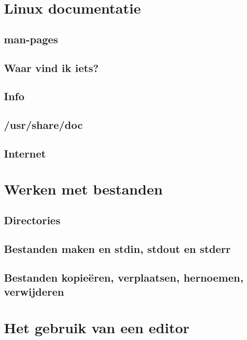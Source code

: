 \documentclass[a4paper,12pt,twoside,openright,titlepage]{book}
\begin{document}
\chapter{Linux documentatie}

\section{man-pages}

\section{Waar vind ik iets?}

\section{Info}

\section{/usr/share/doc}

\section{Internet}


\chapter{Werken met bestanden}

\section{Directories}

\section{Bestanden maken en stdin, stdout en stderr}

\section{Bestanden kopie\"eren, verplaatsen, hernoemen, verwijderen}


\chapter{Het gebruik van een editor}

\end{document}
